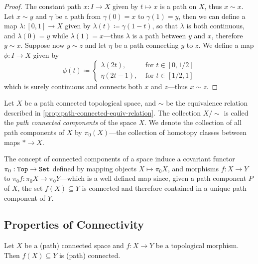 \begin{proof}
The constant path \(x: I \to X\) given by \(t \mapsto x\) is a path on \(X\),
thus \(x \sim x\). Let \(x \sim y\) and \(\gamma\) be a path from
\(\gamma(0) = x\) to \(\gamma(1) = y\), then we can define a map
\(\lambda: [0, 1] \to X\) given by \(\lambda(t) \coloneq \gamma(1 - t)\), so
that \(\lambda\) is both continuous, and \(\lambda(0) = y\) while
\(\lambda(1) = x\)---thus \(\lambda\) is a path between \(y\) and \(x\),
therefore \(y \sim x\). Suppose now \(y \sim z\) and let \(\eta\) be a path
connecting \(y\) to \(z\). We define a map \(\phi: I \to X\) given by
\[
  \phi(t) \coloneq
  \begin{cases}
    \lambda(2t), &\text{ for } t \in [0, 1/2] \\
    \eta(2t - 1), &\text{ for } t \in [1/2, 1]
  \end{cases}
\]
which is surely continuous and connects both \(x\) and \(z\)---thus \(x \sim
z\).
\end{proof}

\begin{definition}
\label{def:path-connected-components}
Let \(X\) be a path connected topological space, and \(\sim\) be the equivalence
relation described in \cref{prop:path-connected-equiv-relation}. The collection
\(X/{\sim}\) is called the \emph{path connected components} of the space
\(X\). We denote the collection of all path components of \(X\) by
\(\pi_0(X)\)---the collection of homotopy classes between maps \(* \to X\).
\end{definition}

\begin{definition}[\(\pi_0\) functor]
\label{def:pi0-functor}
The concept of connected components of a space induce a covariant functor
\(\pi_0: {\texttt{Top}} \to {\texttt{Set}}\) defined by mapping objects \(X \mapsto \pi_0 X\), and
morphisms \(f: X \to Y\) to \(\pi_0 f: \pi_0 X \to \pi_0 Y\)---which is a well
defined map since, given a path component \(P\) of \(X\), the set \(f(X)
\subseteq Y\) is connected and therefore contained in a unique path component of
\(Y\).
\end{definition}

\subsection{Properties of Connectivity}

\begin{theorem}
\label{thm:morphisms-preserve-connectivity}
Let \(X\) be a (path) connected space and \(f: X \to Y\) be a topological
morphism. Then \(f(X) \subseteq Y\) is (path) connected.
\end{theorem}

